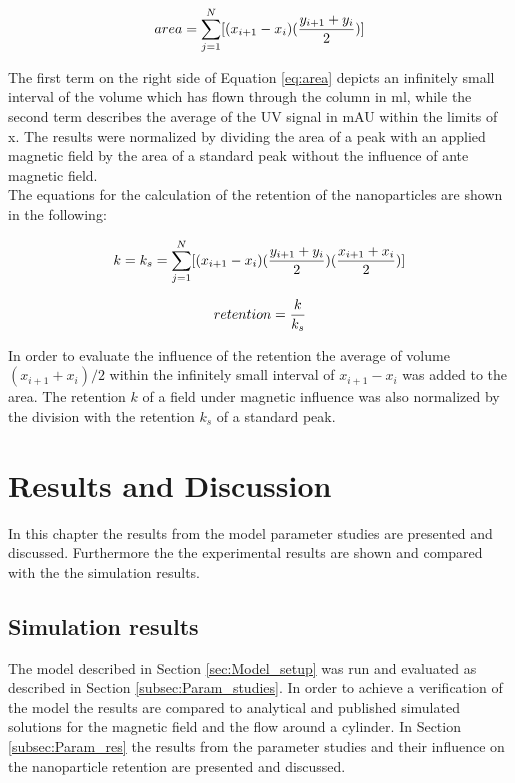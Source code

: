 \begin{equation}
\label{eq:area}
\centering
area = \sum_{j=1}^{N}[(x_{i+1}-x_{i})(\frac{y_{i+1}+y_{i}}{2})]
\end{equation}

The first term on the right side of Equation \ref{eq:area} depicts an infinitely small interval of the volume which has flown through the column in ml, while the second term describes the average of the UV signal in mAU within the limits of x. The results were normalized by dividing the area of a peak with an applied magnetic field by the area of a standard peak without the influence of ante magnetic field. \\


The equations for the calculation of the retention of the nanoparticles are shown in the following: 

\begin{equation}
\label{eq:ret_sum}
\centering
k = k_{s} = \sum_{j=1}^{N}[(x_{i+1}-x_{i})(\frac{y_{i+1}+y_{i}}{2})(\frac{x_{i+1}+x_{i}}{2})]
\end{equation}

\begin{equation}
\label{eq:ret_comp}
\centering
retention = \frac{k}{k_{s}}
\end{equation}

In order to evaluate the influence of the retention the average of volume $(x_{i+1}+x_{i})/2$ within the infinitely small interval of $x_{i+1}-x_{i}$ was added to the area. The retention $k$ of a field under magnetic influence was also normalized by the division with the retention $k_{s}$ of a standard peak.   



\chapter{Results and Discussion}
\label{chap:chap_res}
In this chapter the results from the model parameter studies are presented and discussed. Furthermore the the experimental results are shown and compared with the the simulation results. 

\section{Simulation results}
\label{sec:sim_res}
The model described in Section \ref{sec:Model_setup} was run and evaluated as described in Section \ref{subsec:Param_studies}. In order to achieve a verification of the model the results are compared to analytical and published simulated solutions for the magnetic field and the flow around a cylinder. In Section \ref{subsec:Param_res} the results from the parameter studies and their influence on the nanoparticle retention are presented and discussed.  

